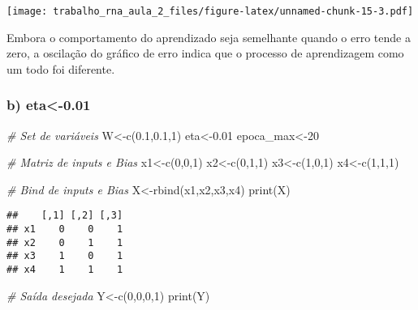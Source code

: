 \documentclass[
]{article}
\newenvironment{Shaded}{\begin{snugshade}}{\end{snugshade}}
\newcommand{\CommentTok}[1]{\textcolor[rgb]{0.56,0.35,0.01}{\textit{#1}}}
\newcommand{\DecValTok}[1]{\textcolor[rgb]{0.00,0.00,0.81}{#1}}
\newcommand{\FloatTok}[1]{\textcolor[rgb]{0.00,0.00,0.81}{#1}}
\newcommand{\FunctionTok}[1]{\textcolor[rgb]{0.00,0.00,0.00}{#1}}
\newcommand{\NormalTok}[1]{#1}
\newcommand{\OtherTok}[1]{\textcolor[rgb]{0.56,0.35,0.01}{#1}}
\begin{document}
\texttt{[image: trabalho\_rna\_aula\_2\_files/figure-latex/unnamed-chunk-15-3.pdf]}

Embora o comportamento do aprendizado seja semelhante quando o erro
tende a zero, a oscilação do gráfico de erro indica que o processo de
aprendizagem como um todo foi diferente.

\hypertarget{b-eta-0.01}{%
\subsubsection{b) eta\textless-0.01}\label{b-eta-0.01}}

\begin{Shaded}
\begin{Highlighting}[]
\CommentTok{\# Set de variáveis}
\NormalTok{W}\OtherTok{\textless{}{-}}\FunctionTok{c}\NormalTok{(}\FloatTok{0.1}\NormalTok{,}\FloatTok{0.1}\NormalTok{,}\DecValTok{1}\NormalTok{)}
\NormalTok{eta}\OtherTok{\textless{}{-}}\FloatTok{0.01}
\NormalTok{epoca\_max}\OtherTok{\textless{}{-}}\DecValTok{20}

\CommentTok{\# Matriz de inputs e Bias}
\NormalTok{x1}\OtherTok{\textless{}{-}}\FunctionTok{c}\NormalTok{(}\DecValTok{0}\NormalTok{,}\DecValTok{0}\NormalTok{,}\DecValTok{1}\NormalTok{)}
\NormalTok{x2}\OtherTok{\textless{}{-}}\FunctionTok{c}\NormalTok{(}\DecValTok{0}\NormalTok{,}\DecValTok{1}\NormalTok{,}\DecValTok{1}\NormalTok{)}
\NormalTok{x3}\OtherTok{\textless{}{-}}\FunctionTok{c}\NormalTok{(}\DecValTok{1}\NormalTok{,}\DecValTok{0}\NormalTok{,}\DecValTok{1}\NormalTok{)}
\NormalTok{x4}\OtherTok{\textless{}{-}}\FunctionTok{c}\NormalTok{(}\DecValTok{1}\NormalTok{,}\DecValTok{1}\NormalTok{,}\DecValTok{1}\NormalTok{)}

\CommentTok{\# Bind de inputs e Bias}
\NormalTok{X}\OtherTok{\textless{}{-}}\FunctionTok{rbind}\NormalTok{(x1,x2,x3,x4)}
\FunctionTok{print}\NormalTok{(X)}
\end{Highlighting}
\end{Shaded}

\begin{verbatim}
##    [,1] [,2] [,3]
## x1    0    0    1
## x2    0    1    1
## x3    1    0    1
## x4    1    1    1
\end{verbatim}

\begin{Shaded}
\begin{Highlighting}[]
\CommentTok{\# Saída desejada}
\NormalTok{Y}\OtherTok{\textless{}{-}}\FunctionTok{c}\NormalTok{(}\DecValTok{0}\NormalTok{,}\DecValTok{0}\NormalTok{,}\DecValTok{0}\NormalTok{,}\DecValTok{1}\NormalTok{)}
\FunctionTok{print}\NormalTok{(Y)}
\end{Highlighting}
\end{Shaded}
\end{document}
